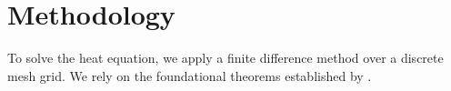 \section{Methodology}
\label{sec:methodology}

To solve the heat equation, we apply a finite difference method over a discrete mesh grid. We rely on the foundational theorems established by \cite{smith2023}.
